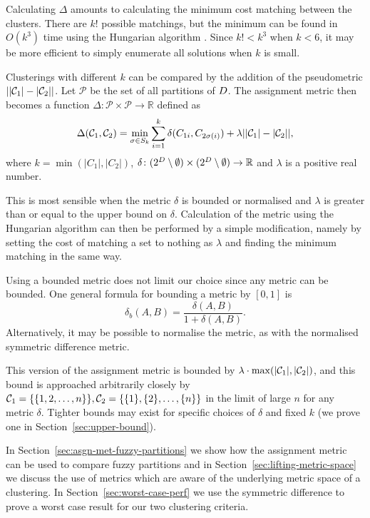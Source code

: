 Calculating $\Delta$ amounts to calculating the minimum cost matching between
the clusters.  There are $k!$ possible matchings, but the minimum can be found
in $O(k^3)$ time using the Hungarian algorithm \cite{kuhn1955hungarian}.
Since $k! < k^3$ when $k < 6$, it may be more efficient to simply enumerate
all solutions when $k$ is small.

Clusterings with different $k$ can be compared by the addition of the
pseudometric $||\mathcal{C}_1|-|\mathcal{C}_2||$.  Let $\mathcal{P}$ be the set of all
partitions of $D$.  The assignment metric then becomes a function $\Delta
\colon \mathcal{P} \times \mathcal{P} \to \mathbb{R}$ defined as
\begin{equation*}
  \Delta(\mathcal{C}_1, \mathcal{C}_2)
  = \min_{\sigma \in S_k} \sum_{i=1}^{k} \delta(C_{1i},C_{2\sigma(i)})
  + \lambda ||\mathcal{C}_1|-|\mathcal{C}_2||,
\end{equation*}
where $k = \min(|C_1|,|C_2|)$, $\delta \colon (2^{D}\setminus \emptyset)
\times (2^{D}\setminus \emptyset) \to \mathbb{R}$ and $\lambda$ is a
positive real number.

This is most sensible when the metric $\delta$ is bounded or normalised and
$\lambda$ is greater than or equal to the upper bound on $\delta$.
Calculation of the metric using the Hungarian algorithm can then be performed
by a simple modification, namely by setting the cost of matching a set to
nothing as $\lambda$ and finding the minimum matching in the same way.

Using a bounded metric does not limit our choice since any metric can be
bounded.  One general formula for bounding a metric by $[0,1]$ is
\begin{equation}
  \label{eq:met-bound}
  \delta_b (A,B) = \frac{\delta(A,B)}{1+\delta(A,B)}.
\end{equation}
Alternatively, it may be possible to normalise the metric, as with the
normalised symmetric difference metric.

This version of the assignment metric is bounded by $\lambda \cdot
\max(|\mathcal{C}_1|,|\mathcal{C}_2|)$, and this bound is approached arbitrarily closely
by $\mathcal{C}_1 = \{\{1,2,\dotsc,n\}\}, \mathcal{C}_2 = \{\{1\},\{2\},\dotsc,\{n\}\}$ in
the limit of large $n$ for any metric $\delta$.  Tighter bounds may exist for
specific choices of $\delta$ and fixed $k$ (we prove one in
Section~\ref{sec:upper-bound}).

In Section~\ref{sec:asgn-met-fuzzy-partitions} we show how the assignment
metric can be used to compare fuzzy partitions and in
Section~\ref{sec:lifting-metric-space} we discuss the use of metrics which are
aware of the underlying metric space of a clustering.  In
Section~\ref{sec:worst-case-perf} we use the symmetric difference to prove a
worst case result for our two clustering criteria.

